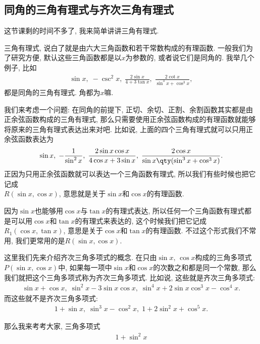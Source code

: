 \documentclass{ctexbook}
\begin{document}
{\subsection{同角的三角有理式与齐次三角有理式}
这节课剩的时间不多了, 我来简单讲讲三角有理式. \par
三角有理式, 说白了就是由六大三角函数和若干常数构成的有理函数. 一般我们为了研究方便, 默认这些三角函数都是以$x$为参数的, 或者说它们是同角的. 我举几个例子, 比如
\begin{align*}
\sin{x},\;-\csc^{2}{x},\;\frac{2\sin{x}}{4+3\tan{x}},\;\frac{2\cot{x}}{\sin^{3}{x}+\cos^{3}{x}}
,\end{align*}
都是同角的三角有理式. 角都为$x$嘛. \par
我们来考虑一个问题: 在同角的前提下, 正切、余切、正割、余割函数其实都是由正余弦函数构成的三角有理式, 那么只需要使用正余弦函数构成的有理函数就能够将原来的三角有理式表达出来对吧. 比如说, 上面的四个三角有理式就可以只用正余弦函数表达为
\begin{align*}
\sin{x},\;-\frac{1}{\sin^{2}{x}},\;\frac{2\sin{x}\cos{x}}{4\cos{x}+3\sin{x}},\;\frac{2\cos{x}}{\sin{x}\qty(\sin^{3}{x}+\cos^{3}{x})}
.\end{align*}
正因为只用正余弦函数就可以表达一个三角函数有理式, 所以我们有些时候也把它记成\\$R(\sin{x},\cos{x})$, 意思就是关于$\sin{x}$和$\cos{x}$的有理函数. \par
因为$\sin{x}$也能够用$\cos{x}$与$\tan{x}$的有理式表达, 所以任何一个三角函数有理式都是可以用$\cos{x}$和$\tan{x}$的有理式来表达的, 这个时候我们把它记成$R_{1}(\cos{x},\tan{x})$, 意思是关于$\cos{x}$和$\tan{x}$的有理函数. 不过这个形式我们不常用, 我们更常用的是$R(\sin{x},\cos{x})$. \par
这里我们先来介绍齐次三角多项式的概念. 在只由$\sin{x},\,\cos{x}$构成的三角多项式$P(\sin{x},\cos{x})$中, 如果每一项中$\sin{x}$和$\cos{x}$的次数之和都是同一个常数, 那么我们就把这个三角多项式称为齐次三角多项式. 比如说, 这些就是齐次三角多项式: 
\begin{align*}
\sin{x}+\cos{x},\;\sin^{2}{x}-3\sin{x}\cos{x},\;\sin^{4}{x}+2\sin{x}\cos^{3}{x}-\cos^{4}{x}
.\end{align*}
而这些就不是齐次三角多项式: 
\begin{align*}
1+\sin{x},\;\sin^{3}{x}-\cos^{2}{x},\;1+2\sin^{2}{x}+\cos^{5}{x}
.\end{align*}\par
那么我来考考大家, 三角多项式
\begin{align*}
1+\sin^{2}{x}
\end{align*}
}
\end{document}
